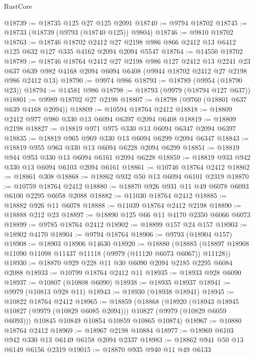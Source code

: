 \begin{lexlean}{RustCore}
\begin{coremodule}
@18739 := @18735 @125 @27 @125 @2091
@18740 := @9794 @18702
@18745 := @18733 (@18739 (@9793 (@18740 @125)) @9804)
@18746 := @9810 @18702
@18763 := @18746
    @18702
    @2412
    @27
    @2198
    @986
    @866
    @2412
    @13
    @6412
    @125
    @632
    @127
    @335
    @4162
    @2094
    @2094
    @5547
@18764 := @14550 @18702
@18789 := @18746
    @18764
    @2412
    @27
    @2198
    @986
    @127
    @2412
    @13
    @2241
    @23
    @637
    @639
    @982
    @4168
    @2094
    @6094
    @6408
    (@9944 @18702 @2412 @27 @2198 @986 @2412 @13)
@18790 := @9974 @986
@18793 := @18789 (@9954 (@18790 @23))
@18794 := @14581 @986
@18798 := @18793 (@9979 (@18794 @127 @637))
@18801 := @9989 @18702 @27 @2198
@18807 := @18798 (@9760 (@18801 @637 @639 @4168 @2094))
@18809 := @10594 @18764 @2412
@18818 := @18809 @2412 @977 @980 @330 @13 @6094 @6397 @2094 @6408
@18819 := @18809 @2198
@18827 := @18819 @971 @975 @330 @13 @6094 @6347 @2094 @6397
@18835 := @18819 @965 @969 @330 @13 @6094 @6299 @2094 @6347
@18843 := @18819 @955 @963 @330 @13 @6094 @6228 @2094 @6299
@18851 := @18819 @944 @953 @330 @13 @6094 @6161 @2094 @6228
@18859 := @18819 @933 @942 @330 @13 @6094 @6103 @2094 @6161
@18861 := @10746 @18764 @2412
@18862 := @18861 @308
@18868 := @18862 @932 @50 @13 @6094 @6101 @2319
@18870 := @10759 @18764 @2412
@18880 := @18870 @926 @931 @11 @49 @6078 @6093 @6100 @2295 @6058 @2088
@18882 := @11030 @18764 @2412
@18885 := @18882 @926 @11 @6078
@18888 := @11039 @18764 @2412 @2198
@18890 := @18888 @212 @23
@18897 := @18890 @125 @66 @11 @4170 @2350 @6066 @6073
@18899 := @9785 @18764 @2412
@18902 := @18899 @157 @24 @157
@18903 := @18902 @4170
@18904 := @9794 @18764
@18906 := @9793 (@18904 @157)
@18908 := @18903 @18906 @14630
@18920 := @18880
    (@18885 (@18897 @18908 @11090 @11098 @11437 @11118 (@9979 (@11120 @6073 @6067)) @11128))
@18930 := @18870 @929 @228 @11 @30 @6090 @2094 @2185 @2295 @6084 @2088
@18933 := @10799 @18764 @2412 @11
@18935 := @18933 @928 @6090
@18937 := @10807 (@10808 @6090)
@18938 := @18935 @18937
@18941 := @9979 (@10813 @928 @11)
@18943 := @18930 (@18938 @18941)
@18945 := @10822 @18764 @2412
@18965 := @18859
    (@18868
      (@18920
        (@18943 @18945 @10827 (@9979 (@10829 @6085 @2094)))
        @10827
        (@9979 (@10829 @6059 @6093)))
      @10845
      @10849
      @10854
      @10859
      @10865
      @10874)
@18967 := @10880 @18764 @2412
@18969 := @18967 @2198 @10884
@18977 := @18969 @6103 @942 @330 @13 @6149 @6158 @2094 @2337
@18983 := @18862 @941 @50 @13 @6149 @6156 @2319
@19015 := @18870
    @935
    @940
    @11
    @49
    @6133

\end{coremodule}
\end{lexlean}

